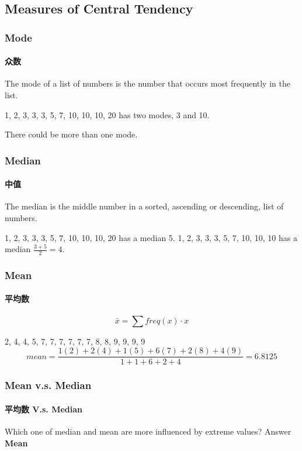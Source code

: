 \documentclass[
	11pt, %
]{beamer}
\begin{document}

\subsection{Measures of Central Tendency}


\begin{frame}
	\frametitle{Mode}
	\framesubtitle{众数}
	\begin{definition}
		The mode of a list of numbers is the number that occurs most frequently
in the list.
	\end{definition}
	\begin{example}
		1, 2, 3, 3, 3, 5, 7, 10, 10, 10, 20 has two modes, 3 and 10.
	\end{example}
	\alert{There could be more than one mode.}
\end{frame}


\begin{frame}
	\frametitle{Median}
	\framesubtitle{中值}
	\begin{definition}
	The median is the middle number in a sorted, ascending or descending, list of numbers.
	\end{definition}
	\begin{example}
		1, 2, 3, 3, 3, 5, 7, 10, 10, 10, 20 has a median 5.
		1, 2, 3, 3, 3, 5, 7, 10, 10, 10 has a median $\frac{3 + 5}{2} = 4$.
	\end{example}
\end{frame}


\begin{frame}
	\frametitle{Mean}
	\framesubtitle{平均数}
	\begin{definition}
	$$\bar{x} =  \sum freq(x) \cdot x$$
	\end{definition}
	\begin{example}
		2, 4, 4, 5, 7, 7, 7, 7, 7, 7, 8, 8, 9, 9, 9, 9\\
		$$mean = \frac{1(2) + 2(4) +  1(5) + 6(7) + 2(8) + 4(9)}{1 + 1 + 6 + 2 + 4} = 6.8125$$
	\end{example}
\end{frame}


\begin{frame}
	\frametitle{Mean v.s. Median}
	\framesubtitle{平均数 V.s. Median}

	{\LARGE Which one of median and mean are more influenced by extreme values?}
	\pause
	\bigskip\bigskip\bigskip\bigskip
	Answer \textbf{Mean}
\end{frame}
\end{document}
